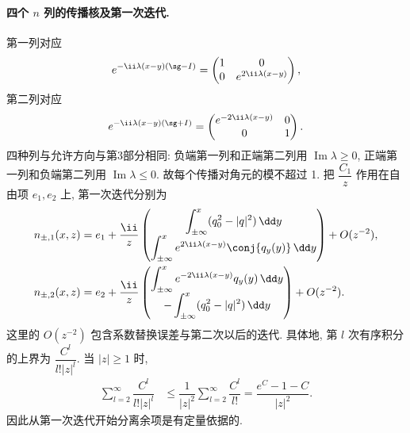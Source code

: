 \paragraph{四个 $n$ 列的传播核及第一次迭代.}
第一列对应
\[
e^{-\ii\lambda(x-y)(\sg-I)}
=\begin{pmatrix}1&0\\0&e^{2\ii\lambda(x-y)}\end{pmatrix},
\]
第二列对应
\[
e^{-\ii\lambda(x-y)(\sg+I)}
=\begin{pmatrix}e^{-2\ii\lambda(x-y)}&0\\0&1\end{pmatrix}.
\]
四种列与允许方向与第3部分相同:
负端第一列和正端第二列用 $\operatorname{Im}\lambda\ge0$,
正端第一列和负端第二列用 $\operatorname{Im}\lambda\le0$.
故每个传播对角元的模不超过 1.
把 $\dfrac{ C_1}{z}$ 作用在自由项 $e_1,e_2$ 上,
第一次迭代分别为
\begin{align*}
n_{\pm,1}(x,z)
&=e_1+\dfrac{\ii}{z}
\begin{pmatrix}
\displaystyle\int_{\pm\infty}^{x}(q_0^2-|q|^2)\,\dd y\\[4pt]
\displaystyle\int_{\pm\infty}^{x}
 e^{2\ii\lambda(x-y)}\conj{q_y(y)}\,\dd y
\end{pmatrix}+O(z^{-2}),\\
n_{\pm,2}(x,z)
&=e_2+\dfrac{\ii}{z}
\begin{pmatrix}
\displaystyle\int_{\pm\infty}^{x}
 e^{-2\ii\lambda(x-y)}q_y(y)\,\dd y\\[4pt]
-\displaystyle\int_{\pm\infty}^{x}(q_0^2-|q|^2)\,\dd y
\end{pmatrix}+O(z^{-2}).
\end{align*}
这里的 $O(z^{-2})$ 包含系数替换误差与第二次以后的迭代.
具体地, 第 $l$ 次有序积分的上界为
$\dfrac{C^l}{l!|z|^l}$.
当 $|z|\ge1$ 时,
\begin{align*}
\sum\limits_{l=2}^{\infty}\dfrac{C^l}{l!|z|^l}
&\le\dfrac{1}{|z|^2}\sum\limits_{l=2}^{\infty}\dfrac{C^l}{l!}
=\dfrac{e^C-1-C}{|z|^2}.
\end{align*}
因此从第一次迭代开始分离余项是有定量依据的.

